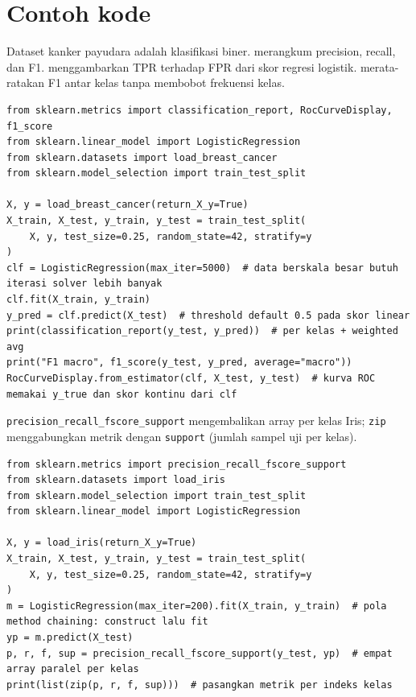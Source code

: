 \documentclass[../main.tex]{subfiles}
\begin{document}
\section{Contoh kode}

\MulaiPenjelasanKode Dataset kanker payudara adalah klasifikasi biner.  merangkum precision, recall, dan F1.  menggambarkan TPR terhadap FPR dari skor  regresi logistik.  merata-ratakan F1 antar kelas tanpa membobot frekuensi kelas. \SelesaiPenjelasanKode

\begin{lstlisting}[caption=ROC curve + classification report (biner)]
from sklearn.metrics import classification_report, RocCurveDisplay, f1_score
from sklearn.linear_model import LogisticRegression
from sklearn.datasets import load_breast_cancer
from sklearn.model_selection import train_test_split

X, y = load_breast_cancer(return_X_y=True)
X_train, X_test, y_train, y_test = train_test_split(
    X, y, test_size=0.25, random_state=42, stratify=y
)
clf = LogisticRegression(max_iter=5000)  # data berskala besar butuh iterasi solver lebih banyak
clf.fit(X_train, y_train)
y_pred = clf.predict(X_test)  # threshold default 0.5 pada skor linear
print(classification_report(y_test, y_pred))  # per kelas + weighted avg
print("F1 macro", f1_score(y_test, y_pred, average="macro"))
RocCurveDisplay.from_estimator(clf, X_test, y_test)  # kurva ROC memakai y_true dan skor kontinu dari clf
\end{lstlisting}

\MulaiPenjelasanKode \texttt{precision\_recall\_fscore\_support} mengembalikan array per kelas Iris; \texttt{zip} menggabungkan metrik dengan \texttt{support} (jumlah sampel uji per kelas). \SelesaiPenjelasanKode

\begin{lstlisting}[caption=Precision/Recall per kelas (multiclass)]
from sklearn.metrics import precision_recall_fscore_support
from sklearn.datasets import load_iris
from sklearn.model_selection import train_test_split
from sklearn.linear_model import LogisticRegression

X, y = load_iris(return_X_y=True)
X_train, X_test, y_train, y_test = train_test_split(
    X, y, test_size=0.25, random_state=42, stratify=y
)
m = LogisticRegression(max_iter=200).fit(X_train, y_train)  # pola method chaining: construct lalu fit
yp = m.predict(X_test)
p, r, f, sup = precision_recall_fscore_support(y_test, yp)  # empat array paralel per kelas
print(list(zip(p, r, f, sup)))  # pasangkan metrik per indeks kelas
\end{lstlisting}
\end{document}
